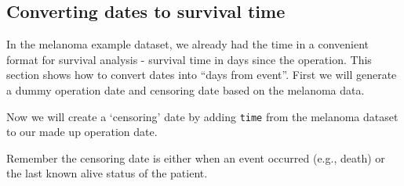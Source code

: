 \documentclass[
  12pt,
  krantz2]{krantz}
\makeatletter
\newenvironment{Shaded}{\begin{snugshade}}{\end{snugshade}}
\newcommand{\CommentTok}[1]{\textcolor[rgb]{0.56,0.35,0.01}{\textit{#1}}}
\newcommand{\DataTypeTok}[1]{\textcolor[rgb]{0.13,0.29,0.53}{#1}}
\newcommand{\DecValTok}[1]{\textcolor[rgb]{0.00,0.00,0.81}{#1}}
\newcommand{\KeywordTok}[1]{\textcolor[rgb]{0.13,0.29,0.53}{\textbf{#1}}}
\newcommand{\NormalTok}[1]{#1}
\newcommand{\OperatorTok}[1]{\textcolor[rgb]{0.81,0.36,0.00}{\textbf{#1}}}
\newcommand{\StringTok}[1]{\textcolor[rgb]{0.31,0.60,0.02}{#1}}
\newenvironment{kframe}{%
\medskip{}
\setlength{\fboxsep}{.8em}
 \def\at@end@of@kframe{}%
 \ifinner\ifhmode%
  \def\at@end@of@kframe{\end{minipage}}%
  \begin{minipage}{\columnwidth}%
 \fi\fi%
 \def\FrameCommand##1{\hskip\@totalleftmargin \hskip-\fboxsep
 \colorbox{shadecolor}{##1}\hskip-\fboxsep
     \hskip-\linewidth \hskip-\@totalleftmargin \hskip\columnwidth}%
 \MakeFramed {\advance\hsize-\width
   \@totalleftmargin\z@ \linewidth\hsize
   \@setminipage}}%
 {\par\unskip\endMakeFramed%
 \at@end@of@kframe}
\renewenvironment{Shaded}{\begin{kframe}}{\end{kframe}}
\makeatother
\begin{document}
\hypertarget{converting-dates-to-survival-time}{%
\subsection{Converting dates to survival time}\label{converting-dates-to-survival-time}}

In the melanoma example dataset, we already had the time in a convenient format for survival analysis - survival time in days since the operation.
This section shows how to convert dates into ``days from event''.
First we will generate a dummy operation date and censoring date based on the melanoma data.

\begin{Shaded}
\end{Shaded}

Now we will create a `censoring' date by adding \texttt{time} from the melanoma dataset to our made up operation date.

Remember the censoring date is either when an event occurred (e.g., death) or the last known alive status of the patient.

\begin{Shaded}
\end{Shaded}
\end{document}
